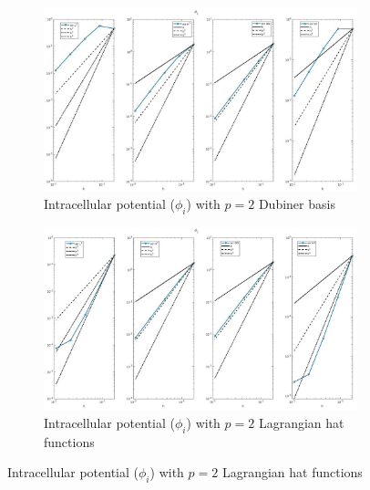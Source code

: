 \documentclass[a4paper,11pt]{article}
\begin{document}
\begin{figure}[H]
\caption{Comparison of the intracellular potential ($\phi_i$)}
\label{phii_2}
\begin{subfigure}{\textwidth}
\begin{center}
\includegraphics[width = \textwidth]{./D2_Phii_1.jpg}
\caption{Intracellular potential ($\phi_i$) with $p=2$ Dubiner basis}
\end{center}
\end{subfigure}
\begin{subfigure}{\textwidth}
\begin{center}
\includegraphics[width =\textwidth]{./P2_Phii_1.jpg}
\caption{Intracellular potential ($\phi_i$) with $p=2$ Lagrangian hat functions}
\end{center}
\end{subfigure}
\end{figure}
\newpage
\end{document}
